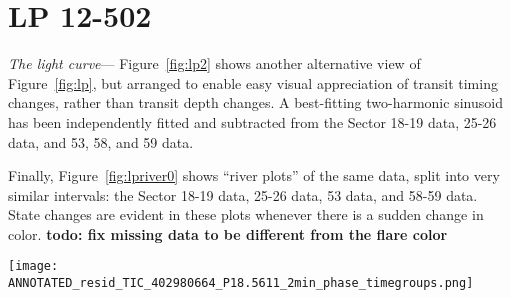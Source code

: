 \documentclass[11pt,twocolumn,tighten]{aastex63}
\begin{document}
\section{LP 12-502}
\label{app:lp}

{\it The light curve}---
Figure~\ref{fig:lp2} shows another alternative view of
Figure~\ref{fig:lp}, but arranged to enable easy visual appreciation
of transit timing changes, rather than transit depth changes.  A
best-fitting two-harmonic sinusoid has been independently fitted and
subtracted from the Sector 18-19 data, 25-26 data, and 53, 58, and 59
data.

Finally, Figure~\ref{fig:lpriver0} shows ``river plots'' of the
same data, split into very similar intervals:
the Sector 18-19 data, 25-26 data, 53 data, and 58-59 data.
State changes are evident in these plots whenever there is a sudden
change in color.
{\bf todo: fix missing data to be different from the flare color} 


\begin{figure*}[!t]
	\begin{center}
    \texttt{[image: ANNOTATED\_resid\_TIC\_402980664\_P18.5611\_2min\_phase\_timegroups.png]}
    	\end{center}
    \vspace{-0.4cm}
		\caption{
	      {\bf Alternative view of the evolution of LP 12-502}
	      (Figure~\ref{fig:lp}), arranged to emphasize changes in transit
	      times.  There are 200 binned black points per cycle; a two-harmonic
	      sinusoid has been subtracted over specific chunks in time ({\bf see text}).
	      Vertical gray lines are underplotted to help guide the eye to instances
	      in which preferred dip phases synchronize over long baselines.
	      The orange and green lines guide the eye to where dips
	      appear to change the positions of their local minima.
		}
		\label{fig:lp2}
\end{figure*}
\end{document}
